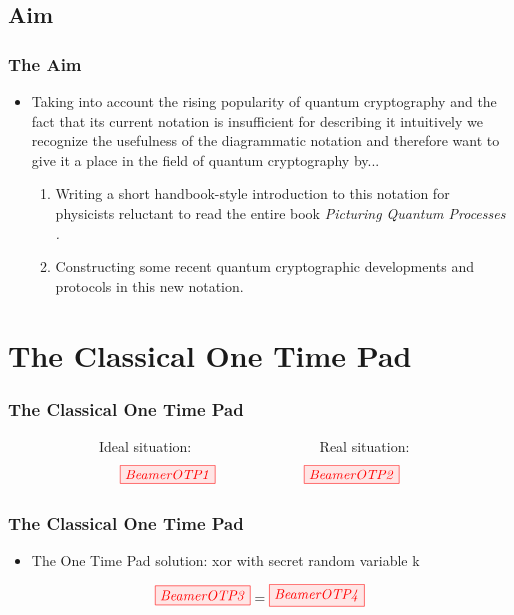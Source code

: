 \documentclass[]{beamer}
\begin{document}
\subsection{Aim}

\begin{frame}
	\frametitle{The Aim}
	\begin{itemize}
		\item Taking into account the rising popularity of quantum cryptography and the fact that its current notation is insufficient for describing it intuitively we recognize the usefulness of the diagrammatic notation and therefore want to give it a place in the field of quantum cryptography by...
		\vspace{0.6cm}
		\begin{enumerate}
			\item Writing a short handbook-style introduction to this notation for physicists reluctant to read the entire book \textit{Picturing Quantum Processes \cite{Coecke2017}.}
			\vspace{0.6cm}
			\item Constructing some recent quantum cryptographic developments and protocols in this new notation.
		\end{enumerate}
	\end{itemize}
\end{frame}

\section{The Classical One Time Pad}
\begin{frame}
	\centering 
	\Huge
\end{frame}
\begin{frame}
	\frametitle{The Classical One Time Pad}
	~~~~~~~~~~~~~Ideal situation:  ~~~~~~~~~~~~~~~~~ Real situation:
	\begin{equation}
	\tikzfig{BeamerOTP1} ~~~~~~~~~~~~~~~~~~~ \tikzfig{BeamerOTP2}
 	\end{equation}
\end{frame}

\begin{frame}
	\frametitle{The Classical One Time Pad}
	\begin{itemize}
	\item The One Time Pad solution: xor with secret random variable k
	\vspace{0.5cm}
	\end{itemize}
\begin{equation}
	\tikzfig{BeamerOTP3} = \tikzfig{BeamerOTP4} %
\end{equation}
\end{frame}
\end{document}
